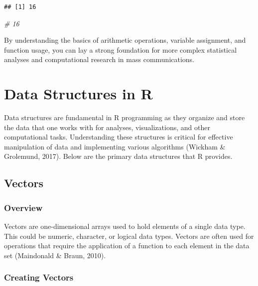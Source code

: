 \documentclass[
  b5paper]{book}
\newenvironment{Shaded}{\begin{snugshade}}{\end{snugshade}}
\newcommand{\CommentTok}[1]{\textcolor[rgb]{0.56,0.35,0.01}{\textit{#1}}}
\begin{document}
\begin{verbatim}
## [1] 16
\end{verbatim}

\begin{Shaded}
\begin{Highlighting}[]
\CommentTok{\# 16}
\end{Highlighting}
\end{Shaded}

By understanding the basics of arithmetic operations, variable assignment, and function usage, you can lay a strong foundation for more complex statistical analyses and computational research in mass communications.

\hypertarget{data-structures-in-r}{%
\section{Data Structures in R}\label{data-structures-in-r}}

Data structures are fundamental in R programming as they organize and store the data that one works with for analyses, visualizations, and other computational tasks. Understanding these structures is critical for effective manipulation of data and implementing various algorithms (Wickham \& Grolemund, 2017). Below are the primary data structures that R provides.

\hypertarget{vectors}{%
\subsection*{Vectors}\label{vectors}}

\hypertarget{overview-2}{%
\subsubsection*{Overview}\label{overview-2}}

Vectors are one-dimensional arrays used to hold elements of a single data type. This could be numeric, character, or logical data types. Vectors are often used for operations that require the application of a function to each element in the data set (Maindonald \& Braun, 2010).

\hypertarget{creating-vectors}{%
\subsubsection*{Creating Vectors}\label{creating-vectors}}
\end{document}
